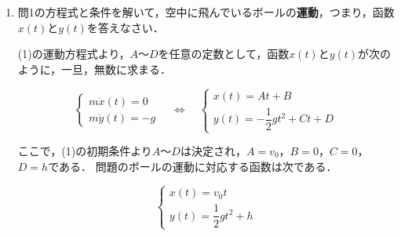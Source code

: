 \documentclass[a4paper,11pt]{ltjsarticle}
\begin{document}
\begin{enumerate}[label={\LARGE \Roman*}]
\begin{enumerate}[label=(\arabic*)]
        \vspace{5pt}        

        地面に着くまでにボールにはたらく力は重力のみである．従って，地面に着くまでの間のボールの運動方程式は次である．

        \begin{equation}
            m(\ddot{x}(t) \quad \ddot{y}(t))=(0 \quad -mg) \quad \Leftrightarrow \quad
            \begin{cases}
                m \ddot{x}(t)=0 \\
                m \ddot{y}(t)=-mg
            \end{cases}
        \end{equation}

        時刻$t=0$には，ボールは位置$(0,h)$におり，かつ，速度が$(v_0,0)$だったので，初期条件は次である．

        \begin{equation}
            x(0)=0,\ y(0)=h  \quad \Leftrightarrow \quad
            \dot{x}(0)=v_0,\ \dot{y}(0)=0
        \end{equation}

        \clearpage

        \item 問1の方程式と条件を解いて，空中に飛んでいるボールの\textbf{運動}，つまり，函数$x(t)$と$y(t)$を答えなさい．
        
        \vspace{5pt}

        (1)の運動方程式より，$A$～$D$を任意の定数として，函数$x(t)$と$y(t)$が次のように，一旦，無数に求まる．

        \begin{equation}
            \begin{cases}
                m \ddot{x}(t)=0 \\
                m \ddot{y}(t)=-g
            \end{cases}
            \quad \Leftrightarrow \quad
            \begin{cases}
                x(t)=At+B \\
                y(t)=-\dfrac{1}{2}gt^2+Ct+D
            \end{cases}
        \end{equation}

        ここで，(1)の初期条件より$A$～$D$は決定され，$A=v_0$，$B=0$，$C=0$，$D=h$である．
        問題のボールの運動に対応する函数は次である．

        \begin{equation}
            \begin{cases}
                x(t)=v_0t \\
                y(t)= \dfrac{1}{2}gt^2+h
            \end{cases}
        \end{equation}


\end{enumerate}
\end{enumerate}
\end{document}
